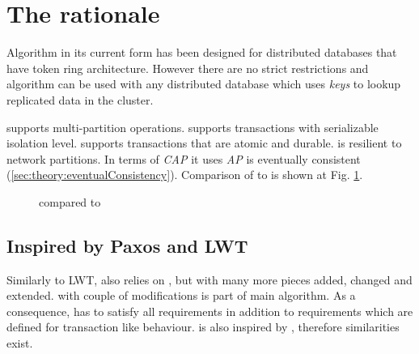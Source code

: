 
\section{The rationale}
Algorithm \mpp in its current form has been designed for distributed databases that have token ring architecture. 
However there are no strict restrictions and algorithm can be used with any distributed database which uses \emph{keys} to lookup replicated data in the cluster. 

\mpp supports multi-partition operations.
\mpp supports transactions with serializable isolation level. 
\mpp supports transactions that are atomic and durable.
\mpp is resilient to network partitions. In terms of \emph{CAP} \cite{Brewer:2012ba} it uses \emph{AP}
\mpp is eventually consistent (\ref{sec:theory:eventualConsistency}). Comparison of \mpp to \lwt is shown at Fig. \ref{fig:mppVsLwt}.

\begin{figure}[hbt]
  \setlength{\unitlength}{1.3cm}  
  \caption{\mpp compared to \lwt}
  \label{fig:mppVsLwt}
\end{figure}




\subsection{Inspired by Paxos and LWT}
Similarly to LWT, \mpp also relies on \paxos, but with many more pieces added, changed and extended. 
\paxos with couple of modifications is part of main \mpp algorithm. As a consequence, \mpp has to satisfy all \paxos requirements in addition to requirements which are defined for transaction like behaviour. \mpp is also inspired by \lwt, therefore similarities exist.        


